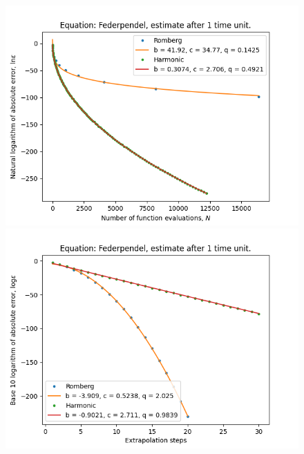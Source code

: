 \begin{figure}[H]
\centering
\begin{minipage}{0.45\textwidth}
\centering
\includegraphics[scale=0.45]{emr_plots/federpendel_1_hp_trend.png}
\end{minipage}
\begin{minipage}{0.45\textwidth}
\centering
\includegraphics[scale=0.45]{emr_plots/federpendel_1_hp_steps.png}
\end{minipage}
\end{figure}

